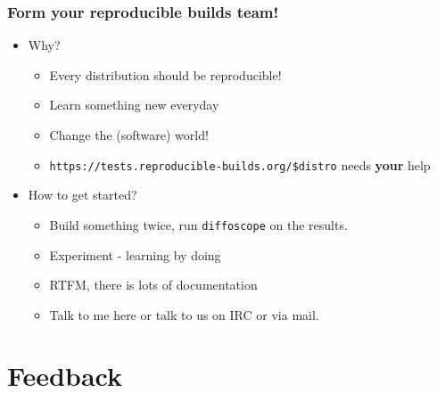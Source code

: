 \documentclass[14pt]{beamer}
\newif\ifplacelogo
\begin{document}
\begin{frame}
 \frametitle{Form your reproducible builds team!}
 \begin{itemize}
  \item Why?
   \begin{itemize}
    \item Every distribution should be reproducible!
    \item Learn something new everyday
    \item Change the (software) world!
    \item \texttt{https://tests.reproducible-builds.org/\$distro} needs \textbf{your} help
   \end{itemize}
  \item How to get started?
   \begin{itemize}
    \item Build something twice, run \texttt{diffoscope} on the results.
    \item Experiment - learning by doing
    \item RTFM, there is lots of documentation
    \item Talk to me here or talk to us on IRC or via mail.
   \end{itemize}
 \end{itemize}
\end{frame}

\section{Feedback}

\placelogotrue
\end{document}
